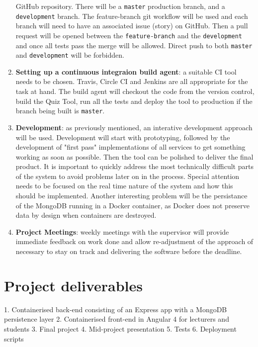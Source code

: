 \documentclass[11pt,fleqn,twoside]{article}
\begin{document}
\begin{enumerate}
    GitHub repository. There will be a \texttt{master} production branch, and a \texttt{development} branch.
    The feature-branch git workflow will be used and each branch will need to have an associated issue (story)
    on GitHub. Then a pull request will be opened between the \texttt{feature-branch} and the \texttt{development}
    and once all tests pass the merge will be allowed. Direct push to both \texttt{master} and \texttt{development}
    will be forbidden.
  \item \textbf{Setting up a continuous integraion build agent}: a suitable CI tool needs to be chosen. Travis, Circle CI
    and Jenkins are all appropriate for the task at hand. The build agent will checkout the code from the version control,
    build the Quiz Tool, run all the tests and deploy the tool to production if the branch being built is \texttt{master}.
  \item \textbf{Development}: as previously mentioned, an interative development approach will be used. Development will start
    with prototyping, followed by the development of "first pass" implementations of all services to get something
    working as soon as possible. Then the tool can be polished to deliver the final product. It is important to quickly
    address the most technically difficult parts of the system to avoid problems later on in the process. Special
    attention needs to be focused on the real time nature of the system and how this should be implemented. Another
    interesting problem will be the persistance of the MongoDB running in a Docker container, as Docker does not
    preserve data by design when containers are destroyed.
  \item \textbf{Project Meetings}: weekly meetings with the supervisor will provide immediate feedback on work done
    and allow re-adjustment of the approach of necessary to stay on track and delivering the software before the deadline.
\end{enumerate}

\section{Project deliverables}
1. Containerised back-end consisting of an Express app with a MongoDB persistence layer
2. Containerised front-end in Angular 4 for lecturers and students
3. Final project
4. Mid-project presentation
5. Tests
6. Deployment scripts
\end{document}
